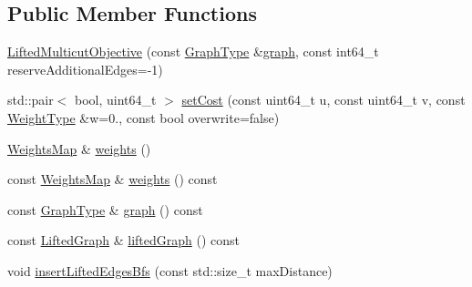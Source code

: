 \subsection*{Public Member Functions}
\begin{DoxyCompactItemize}
\item 
\hyperlink{classnifty_1_1graph_1_1opt_1_1lifted__multicut_1_1LiftedMulticutObjective_a4e6cf1863194345823c0a9f63b107d87}{Lifted\+Multicut\+Objective} (const \hyperlink{classnifty_1_1graph_1_1opt_1_1lifted__multicut_1_1LiftedMulticutObjective_a29cf21c14a4ffdb1f8697d535c3d458e}{Graph\+Type} \&\hyperlink{classnifty_1_1graph_1_1opt_1_1lifted__multicut_1_1LiftedMulticutObjective_a8d6d6acb6ede5daa1d50ddb2128dc0cd}{graph}, const int64\+\_\+t reserve\+Additional\+Edges=-\/1)
\item 
std\+::pair$<$ bool, uint64\+\_\+t $>$ \hyperlink{classnifty_1_1graph_1_1opt_1_1lifted__multicut_1_1LiftedMulticutObjective_ace9967d2de2017378d8733bba631f120}{set\+Cost} (const uint64\+\_\+t u, const uint64\+\_\+t v, const \hyperlink{classnifty_1_1graph_1_1opt_1_1lifted__multicut_1_1LiftedMulticutObjective_a75ee804d11d3547f9985816c6805e6a8}{Weight\+Type} \&w=0., const bool overwrite=false)
\item 
\hyperlink{classnifty_1_1graph_1_1opt_1_1lifted__multicut_1_1LiftedMulticutObjective_ab4bdcf27ce49303201bb4332db89a78c}{Weights\+Map} \& \hyperlink{classnifty_1_1graph_1_1opt_1_1lifted__multicut_1_1LiftedMulticutObjective_ae6a1e843d6c7190eccc34c1504c14c45}{weights} ()
\item 
const \hyperlink{classnifty_1_1graph_1_1opt_1_1lifted__multicut_1_1LiftedMulticutObjective_ab4bdcf27ce49303201bb4332db89a78c}{Weights\+Map} \& \hyperlink{classnifty_1_1graph_1_1opt_1_1lifted__multicut_1_1LiftedMulticutObjective_aa713c5185db3244124de5af5a5567c5f}{weights} () const
\item 
const \hyperlink{classnifty_1_1graph_1_1opt_1_1lifted__multicut_1_1LiftedMulticutObjective_a29cf21c14a4ffdb1f8697d535c3d458e}{Graph\+Type} \& \hyperlink{classnifty_1_1graph_1_1opt_1_1lifted__multicut_1_1LiftedMulticutObjective_a8d6d6acb6ede5daa1d50ddb2128dc0cd}{graph} () const
\item 
const \hyperlink{classnifty_1_1graph_1_1opt_1_1lifted__multicut_1_1LiftedMulticutObjective_a560fc2d21604ab9e3e23496d47839ff9}{Lifted\+Graph} \& \hyperlink{classnifty_1_1graph_1_1opt_1_1lifted__multicut_1_1LiftedMulticutObjective_a1a26f38fad2ecfb9ded95104db038f7e}{lifted\+Graph} () const
\item 
void \hyperlink{classnifty_1_1graph_1_1opt_1_1lifted__multicut_1_1LiftedMulticutObjective_a9d8574eee3c7e8f4e39bb9d20f3db481}{insert\+Lifted\+Edges\+Bfs} (const std\+::size\+\_\+t max\+Distance)

\end{DoxyCompactItemize}
